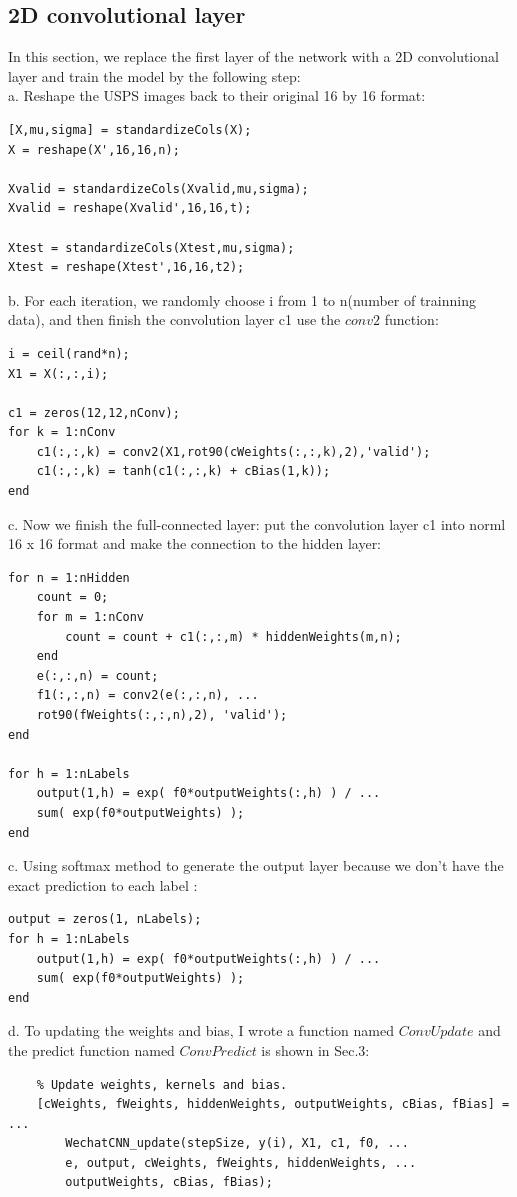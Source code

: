 \documentclass[12pt]{article}
\begin{document}
\subsection{2D convolutional layer}
In this section, we replace the first layer of the network with a 2D convolutional layer and train the model by the following step:\\
a. Reshape the USPS images back to their original 16 by 16 format:
\begin{lstlisting}
[X,mu,sigma] = standardizeCols(X);
X = reshape(X',16,16,n);

Xvalid = standardizeCols(Xvalid,mu,sigma);
Xvalid = reshape(Xvalid',16,16,t);

Xtest = standardizeCols(Xtest,mu,sigma);
Xtest = reshape(Xtest',16,16,t2);
\end{lstlisting}
b. For each iteration, we randomly choose i from 1 to n(number of trainning data), and then finish the convolution layer c1 use the $conv2$ function:
\begin{lstlisting}
i = ceil(rand*n);
X1 = X(:,:,i);

c1 = zeros(12,12,nConv);
for k = 1:nConv
	c1(:,:,k) = conv2(X1,rot90(cWeights(:,:,k),2),'valid');
	c1(:,:,k) = tanh(c1(:,:,k) + cBias(1,k));
end
\end{lstlisting}
c. Now we finish the full-connected layer: put the convolution layer c1 into norml 16 x 16 format and make the connection to the hidden layer:
\begin{lstlisting}
for n = 1:nHidden
	count = 0;
	for m = 1:nConv
		count = count + c1(:,:,m) * hiddenWeights(m,n);
	end
	e(:,:,n) = count;
	f1(:,:,n) = conv2(e(:,:,n), ...
	rot90(fWeights(:,:,n),2), 'valid');
end 

for h = 1:nLabels
	output(1,h) = exp( f0*outputWeights(:,h) ) / ...
	sum( exp(f0*outputWeights) );
end
\end{lstlisting}
c. Using softmax method to generate the output layer because we don't have the exact prediction to each label :
\begin{lstlisting}
output = zeros(1, nLabels);
for h = 1:nLabels
	output(1,h) = exp( f0*outputWeights(:,h) ) / ...
	sum( exp(f0*outputWeights) );
end
\end{lstlisting}
d. To updating the weights and bias, I wrote a function named $ConvUpdate$ and the predict function named $ConvPredict$ is shown in Sec.3:
\begin{lstlisting}
    % Update weights, kernels and bias.
    [cWeights, fWeights, hiddenWeights, outputWeights, cBias, fBias] = ...
        WechatCNN_update(stepSize, y(i), X1, c1, f0, ...
        e, output, cWeights, fWeights, hiddenWeights, ...
        outputWeights, cBias, fBias);
\end{lstlisting}
\end{document}
